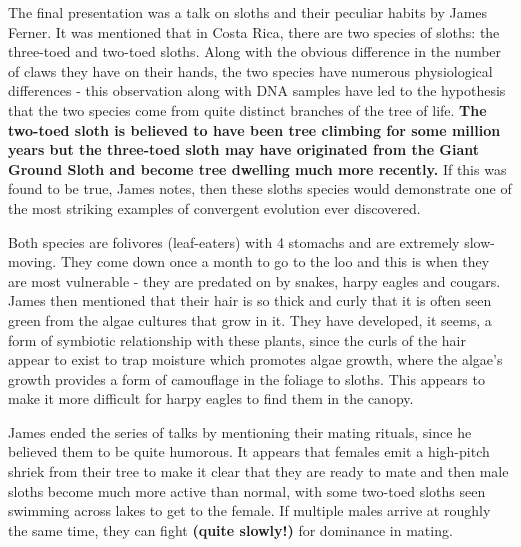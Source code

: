 The final presentation was a talk on sloths and their peculiar habits by
James Ferner. It was mentioned that in Costa Rica, there are two species
of sloths: the three-toed and two-toed sloths. Along with the obvious
difference in the number of claws they have on their hands, the two
species have numerous physiological differences - this observation along
with DNA samples have led to the hypothesis that the two species come
from quite distinct branches of the tree of life.
\textbf{The two-toed sloth is believed to have been tree climbing for some million years but the three-toed sloth may have originated from the Giant Ground Sloth and become tree dwelling much more recently.}
If this was found to be true, James notes, then these sloths species
would demonstrate one of the most striking examples of convergent
evolution ever discovered.

Both species are folivores (leaf-eaters) with 4 stomachs and are
extremely slow-moving. They come down once a month to go to the loo and
this is when they are most vulnerable - they are predated on by snakes,
harpy eagles and cougars. James then mentioned that their hair is so
thick and curly that it is often seen green from the algae cultures that
grow in it. They have developed, it seems, a form of symbiotic
relationship with these plants, since the curls of the hair appear to
exist to trap moisture which promotes algae growth, where the algae's
growth provides a form of camouflage in the foliage to sloths. This
appears to make it more difficult for harpy eagles to find them in the
canopy.

James ended the series of talks by mentioning their mating rituals,
since he believed them to be quite humorous. It appears that females
emit a high-pitch shriek from their tree to make it clear that they are
ready to mate and then male sloths become much more active than normal,
with some two-toed sloths seen swimming across lakes to get to the
female. If multiple males arrive at roughly the same time, they can
fight \textbf{(quite slowly!)} for dominance in mating.


